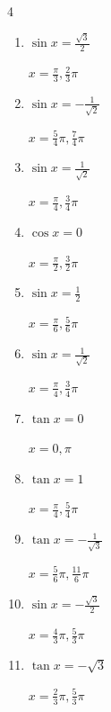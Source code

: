 \begin{multicols}{4}
\begin{enumerate}
        $\displaystyle x = \frac{\pi}{3} , \frac{2}{3}\pi$

  \item $\displaystyle \sin{x}  = \frac{\sqrt{3}}{2}$

        $\displaystyle x = \frac{\pi}{3} , \frac{2}{3}\pi$

  \item $\displaystyle \sin{x}  = -\frac{1}{\sqrt{2}}$

        $\displaystyle x = \frac{5}{4}\pi , \frac{7}{4}\pi$

  \item $\displaystyle \sin{x}  = \frac{1}{\sqrt{2}}$

        $\displaystyle x = \frac{\pi}{4} , \frac{3}{4}\pi$

  \item $\displaystyle \cos{x}  = 0$

        $\displaystyle x = \frac{\pi}{2} , \frac{3}{2}\pi$

  \item $\displaystyle \sin{x}  = \frac{1}{2}$

        $\displaystyle x = \frac{\pi}{6} , \frac{5}{6}\pi$

  \item $\displaystyle \sin{x}  = \frac{1}{\sqrt{2}}$

        $\displaystyle x = \frac{\pi}{4} , \frac{3}{4}\pi$

  \item $\displaystyle \tan{x}  = 0$

        $\displaystyle x = 0 , \pi$

  \item $\displaystyle \tan{x}  = 1$

        $\displaystyle x = \frac{\pi}{4} , \frac{5}{4}\pi$

\columnbreak %

  \item $\displaystyle \tan{x}  = -\frac{1}{\sqrt{3}}$

        $\displaystyle x = \frac{5}{6}\pi , \frac{11}{6}\pi$

  \item $\displaystyle \sin{x}  = -\frac{\sqrt{3}}{2}$

        $\displaystyle x = \frac{4}{3}\pi , \frac{5}{3}\pi$

  \item $\displaystyle \tan{x}  = -\sqrt{3}$

        $\displaystyle x = \frac{2}{3}\pi , \frac{5}{3}\pi$


\end{enumerate}
\end{multicols}
